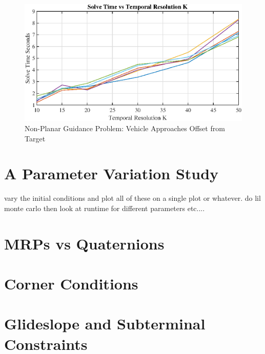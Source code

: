 \begin{figure}[!htbp] 
\label{}
  \centering
  \includegraphics[width=\textwidth]{figs/solvetimevsK.eps}
  \caption{Non-Planar Guidance Problem: Vehicle Approaches Offset from Target}
  \label{fig:nplanarcontrols}
\end{figure}



\section{A Parameter Variation Study}
vary the initial conditions and plot all of these on a single plot or whatever.
do lil monte carlo
then look at runtime for different parameters etc....


\section{MRPs vs Quaternions}

\section{Corner Conditions}

\section{Glideslope and Subterminal Constraints}
